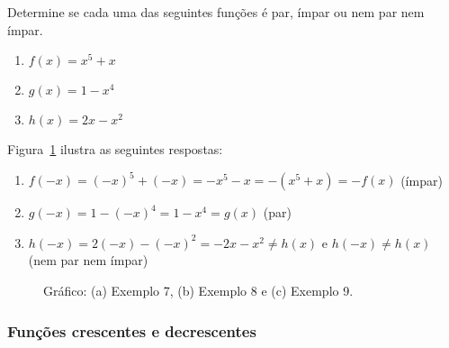  Determine se cada uma das seguintes funções é par, ímpar ou nem par nem ímpar. 

\vspace{-0.6cm}
\begin{multicols}{3}
\vspace{-1cm}
  \begin{enumerate}[label=(\alph*)]
    \item $f(x) = x^5 + x$
    \item $g(x) = 1-x^4$
    \item $h(x) = 2x-x^2$
  \end{enumerate}

\end{multicols}  
\vspace{1cm}

\solution Figura~\ref{fig:ex10} ilustra as seguintes respostas:
\begin{enumerate}[label=(\alph*)]
  \item $f(-x)=(-x)^5 + (-x)= -x^5-x=-(x^5+x)=-f(x)$ (ímpar)
  \item $g(-x)=1-(-x)^4=1-x^4=g(x)$ (par)
  \item $h(-x)=2(-x)-(-x)^2=-2x-x^2\neq h(x)$ e $h(-x)\neq h(x)$ (nem par nem ímpar)
\end{enumerate}\vspace{-0.7cm}
\begin{figure}[!ht]
  \centering
  \caption{Gráfico: (a) Exemplo 7, (b) Exemplo 8 e (c) Exemplo 9.}
  \label{fig:ex10}
  \vspace{-0.5cm}
\end{figure}

\subsubsection{Funções crescentes e decrescentes}

